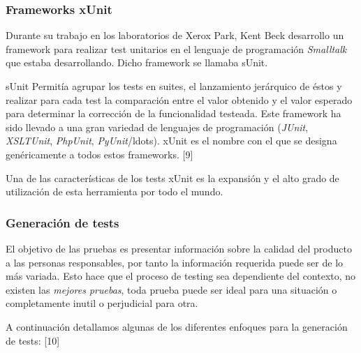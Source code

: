\subsubsection*{Frameworks xUnit}

Durante su trabajo en los laboratorios de Xerox Park, Kent Beck desarrollo un framework para realizar test unitarios en el lenguaje de programaci\'on {\it Smalltalk} que estaba desarrollando. Dicho framework se llamaba sUnit. 

sUnit Permit\'ia agrupar los tests en suites, el lanzamiento jer\'arquico de \'estos y realizar para cada test la comparaci\'on entre el valor obtenido y el valor esperado para determinar la correcci\'on de la funcionalidad testeada. Este framework ha sido llevado a una gran variedad de lenguajes de programaci\'on ({\it JUnit}, {\it XSLTUnit}, {\it PhpUnit}, {\it PyUnit}/ldots). xUnit es el nombre con el que se designa gen\'ericamente a todos estos frameworks. [9]

Una de las caracter\'isticas de los tests xUnit es la expansi\'on y el alto grado de utilizaci\'on de esta herramienta por todo el mundo.



\subsubsection*{Generaci\'on de tests}

El objetivo de las pruebas es presentar informaci\'on sobre la calidad del producto a las personas responsables, por tanto la informaci\'on requerida puede ser de lo m\'as variada. Esto hace que el proceso de testing sea dependiente del contexto, no existen las {\it mejores pruebas}, toda prueba puede ser ideal para una situaci\'on o completamente inutil o perjudicial para otra. 

A continuaci\'on detallamos algunas de los diferentes enfoques para la generaci\'on de tests: [10]

